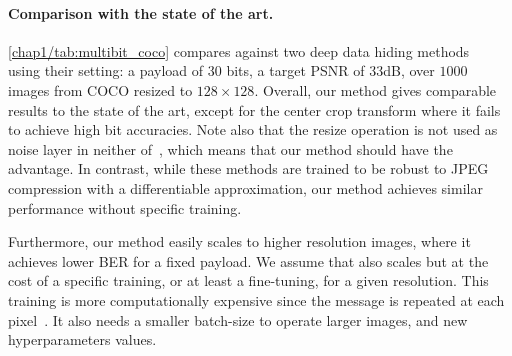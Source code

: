 \paragraph*{Comparison with the state of the art.}
\autoref{chap1/tab:multibit_coco} compares against two deep data hiding methods~\citep{zhu2018hidden,luo2020distortion} using their setting: a payload of $30$ bits, a target PSNR of 33dB, over $1000$ images from COCO resized to $128 \times 128$. 
Overall, our method gives comparable results to the state of the art, except for the center crop transform where it fails to achieve high bit accuracies. 
Note also that the resize operation is not used as noise layer in neither of~\citep{zhu2018hidden,luo2020distortion}, which means that our method should have the advantage.
In contrast, while these methods are trained to be robust to JPEG compression with a differentiable approximation, our method achieves similar performance without specific training.

Furthermore, our method easily scales to higher resolution images, where it achieves lower BER for a fixed payload. 
We assume that \citep{zhu2018hidden,luo2020distortion} also scales but at the cost of a specific training, or at least a fine-tuning, for a given resolution. 
This training is more computationally expensive since the message is repeated at each pixel~\citep{zhu2018hidden}. 
It also needs a smaller batch-size to operate larger images, and new hyperparameters values.






